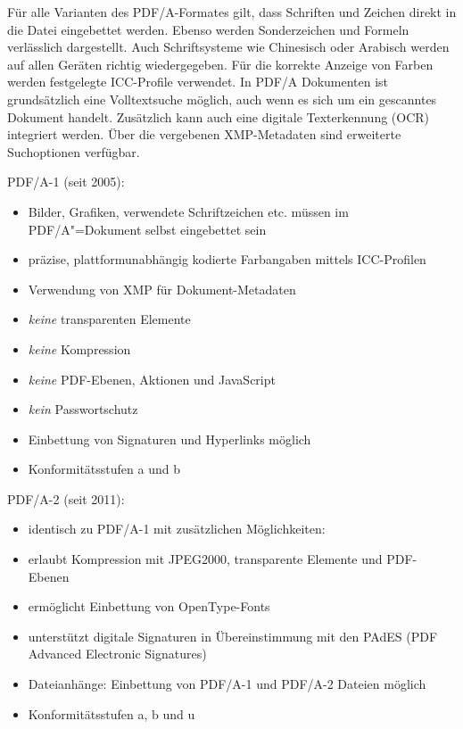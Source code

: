 Für alle Varianten des PDF/A-Formates gilt, dass Schriften und Zeichen direkt in die Datei eingebettet werden. Ebenso werden Sonderzeichen und Formeln verlässlich dargestellt. Auch Schriftsysteme wie Chinesisch oder Arabisch werden auf allen Geräten richtig wiedergegeben. Für die korrekte Anzeige von Farben werden festgelegte ICC-Profile verwendet. In PDF/A Dokumenten ist grundsätzlich eine Volltextsuche möglich, auch wenn es sich um ein gescanntes Dokument handelt. Zusätzlich kann auch eine digitale Texterkennung (OCR) integriert werden. Über die vergebenen XMP-Metadaten sind erweiterte Suchoptionen verfügbar.

\vspace{3mm}
PDF/A-1 (seit 2005):
\begin{itemize}
	\item Bilder, Grafiken, verwendete Schriftzeichen etc. müssen im PDF/A"=Dokument selbst eingebettet sein
	\item präzise, plattformunabhängig kodierte Farbangaben mittels ICC-Profilen
	\item Verwendung von XMP für Dokument-Metadaten
	\item \emph{keine} transparenten Elemente
	\item \emph{keine} Kompression 
	\item \emph{keine} PDF-Ebenen, Aktionen und JavaScript
	\item \emph{kein} Passwortschutz
	\item Einbettung von Signaturen und Hyperlinks möglich
	\item Konformitätsstufen a und b
\end{itemize}\vspace{3mm}

PDF/A-2 (seit 2011):
\begin{itemize}
	\item identisch zu PDF/A-1 mit zusätzlichen Möglichkeiten:
	\item erlaubt Kompression mit JPEG2000, transparente Elemente und PDF-Ebenen
	\item ermöglicht Einbettung von OpenType-Fonts
	\item unterstützt digitale Signaturen in Übereinstimmung mit den PAdES (PDF Advanced Electronic Signatures)
	\item Dateianhänge: Einbettung von PDF/A-1 und PDF/A-2 Dateien möglich
	\item Konformitätsstufen a, b und u
\end{itemize}\vspace{3mm}

